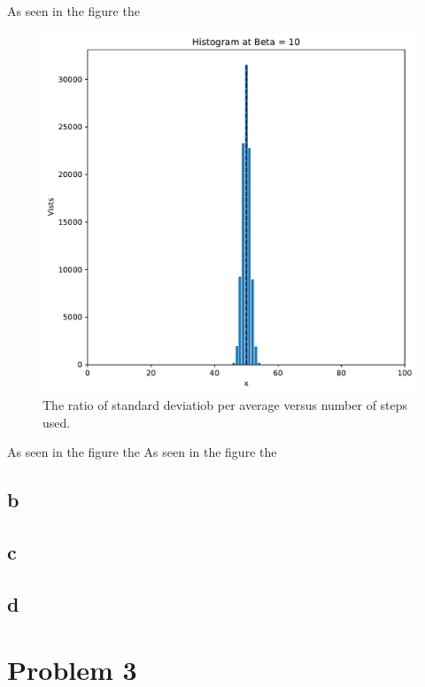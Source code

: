 \documentclass[a4paper]{article}
\theoremstyle{definition}
\begin{document}
As seen in the figure the
\begin{figure}[H]
\centering
\includegraphics[width = 10 cm]{Comp_set_1/Histogram_b3_cs1_2a.pdf}
\caption{The ratio of standard deviatiob per average versus number of steps used.
}
\label{fig:confined_lattice}
\end{figure}  
As seen in the figure the
As seen in the figure the
\subsection{b}
\subsection{c}
\subsection{d}
\section{Problem 3}
\end{document}
